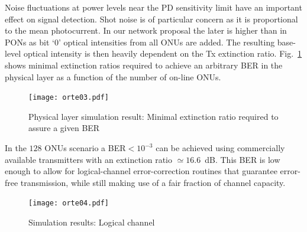 \documentclass[12pt,twoside,openright]{moddalthesis}
\begin{document}
Noise fluctuations at power levels near the PD sensitivity limit have an important effect on signal detection. 
Shot noise is of particular concern as it is proportional to the mean photocurrent.
In our network proposal the later is higher than in PONs as bit
`0' optical intensities from all ONUs are added.
The resulting base-level optical intensity is then heavily dependent on the Tx extinction ratio.
Fig.~\ref{sim:optical} shows minimal extinction ratios required to
achieve an arbitrary BER in the physical layer as a function of the
number of on-line ONUs.
\begin{figure}[!t]
    \centering
      \texttt{[image: orte03.pdf]}
      \caption{Physical layer simulation result: Minimal extinction ratio required to assure a given BER}
      \label{sim:optical}
\end{figure}
In the $128$ ONUs scenario a  BER$<10^{-3}$ can be achieved using
commercially available transmitters with an extinction ratio $\simeq16.6$~dB.
This BER is low enough to allow for logical-channel error-correction routines that guarantee error-free transmission, while still making use of a fair fraction of channel capacity.
\begin{figure}[!t]
    \centering
      \texttt{[image: orte04.pdf]}
    \caption{Simulation results: Logical channel}
      \label{sim:access}
\end{figure}
\end{document}
